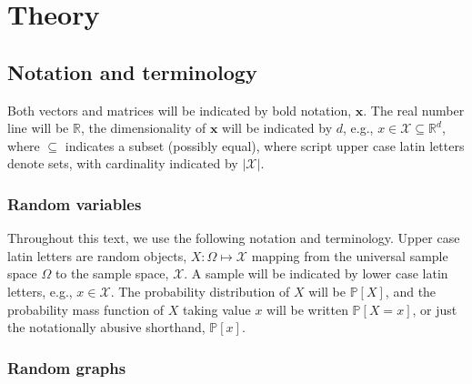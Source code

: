 \documentclass[10pt,journal,cspaper,compsoc]{IEEEtran}
\providecommand{\mc}[1]{\mathcal{#1}}
\providecommand{\mb}[1]{\mathbf{#1}}
\newcommand{\Real}{\mathbb{R}}
\newcommand{\PP}{\mathbb{P}}
\begin{document}

\section{Theory} %
\label{sec:theory}

\subsection{Notation and terminology} %
\label{sub:terminology_and_notation}

Both vectors and matrices will be indicated by bold notation, $\mb{x}$.  The real number line will be $\Real$, the dimensionality of $\mb{x}$ will be indicated by $d$, e.g., $x \in \mc{X} \subseteq \Real^{d}$, where $\subseteq$ indicates a subset (possibly equal), where script upper case latin letters denote sets, with cardinality indicated by $|\mc{X}|$. 


\subsubsection{Random variables} %
\label{ssub:subsubsection_name}


Throughout this text, we use the following notation and terminology.  Upper case latin letters are random objects, $X: \Omega \mapsto \mc{X}$ mapping from the universal sample space $\Omega$ to the sample space, $\mc{X}$.  A sample will be indicated by lower case latin letters, e.g., $x \in \mc{X}$.  The probability distribution of $X$ will be $\PP[X]$, and the probability mass function of $X$ taking value $x$ will be written $\PP[X=x]$, or just the notationally abusive shorthand, $\PP[x]$. 



\subsubsection{Random graphs} %
\label{ssub:random_graphs}
\end{document}
